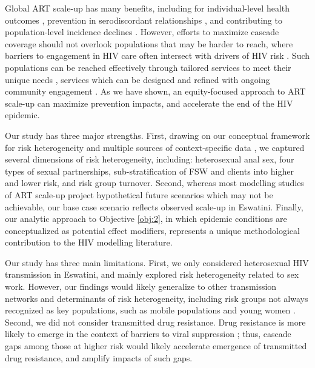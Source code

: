 \par
Global ART scale-up has many benefits, including for
individual-level health outcomes \cite{Gabillard2013,Lundgren2015init},
prevention in serodiscordant relationships \cite{Cohen2016},
and contributing to population-level incidence declines \cite{Havlir2020}.
However, efforts to maximize cascade coverage should not overlook
populations that may be harder to reach,
where barriers to engagement in HIV care often intersect with drivers of HIV risk
\cite{Wanyenze2016,Schwartz2017,Schmidt-Sane2022,Baral2019}.
Such populations can be reached effectively through
tailored services to meet their unique needs \cite{Ehrenkranz2019},
services which can be designed and refined with ongoing community engagement
\cite{Chikwari2018,Mlambo2019,Comins2022}.
As we have shown, an equity-focused approach to ART scale-up can maximize prevention impacts,
and accelerate the end of the HIV epidemic.
\par
Our study has three major strengths.
First, drawing on our conceptual framework for risk heterogeneity \cite[Table~1]{Knight2022sr}
and multiple sources of context-specific data \cite{SDHS2006,SHIMS1,Justman2016,Baral2014,EswKP2014},
we captured several dimensions of risk heterogeneity, including:
heterosexual anal sex,
four types of sexual partnerships,
sub-stratification of FSW and clients into higher and lower risk,
and risk group turnover.
Second, whereas most modelling studies of ART scale-up
project hypothetical future scenarios which may not be achievable,
our base case scenario reflects observed scale-up in Eswatini.
Finally, our analytic approach to Objective \ref{obj:2},
in which epidemic conditions are conceptualized as potential effect modifiers,
represents a unique methodological contribution to the HIV modelling literature.
\par
Our study has three main limitations.
First, we only considered heterosexual HIV transmission in Eswatini,
and mainly explored risk heterogeneity related to sex work.
However, our findings would likely generalize
to other transmission networks and determinants of risk heterogeneity,
including risk groups not always recognized as key populations,
such as mobile populations and young women \cite{Tanser2015,Cheuk2020}.
Second, we did not consider transmitted drug resistance.
Drug resistance is more likely to emerge
in the context of barriers to viral suppression \cite{Pham2014};
thus, cascade gaps among those at higher risk
would likely accelerate emergence of transmitted drug resistance, and amplify impacts of such gaps.
